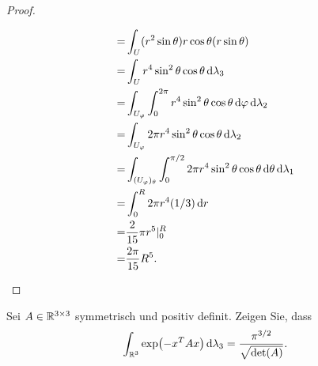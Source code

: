 \begin{proof}
\begin{parts}
\begin{align*}
			 =&\int_U (r^2\sin\theta)r\cos\theta(r\sin\theta)\\
			 =&\int_U r^4\sin^2\theta\cos\theta\dd{\lambda_3}\\
			 =&\int_{U_\varphi}\int_0^{2\pi}r^4\sin^2\theta\cos\theta\dd{\varphi}\dd{\lambda_2}\\
			 =&\int_{U_\varphi}2\pi r^4\sin^2\theta\cos\theta\dd{\lambda_2}\\
			 =&\int_{(U_\varphi)_\theta}\int_0^{\pi / 2}2\pi r^4\sin^2\theta\cos\theta\dd{\theta}\dd{\lambda_1}\\
			 =&\int_0^R 2\pi r^4(1 / 3)\dd{r}\\
			 =&\frac{2}{15}\pi r^5|_0^R\\
			 =&\frac{2\pi}{15}R^5.\qedhere
		\end{align*}
	\end{parts}
\end{proof}
\begin{Problem}
	Sei $A\in \mathbb{R}^{3\times 3}$ symmetrisch und positiv definit. Zeigen Sie, dass
	\[
		\int_{\mathbb{R}^3}\exp(-x^TAx)\dd{\lambda_3}=\frac{\pi^{3 / 2}}{\sqrt{\text{det}(A)} }
	.\] 
\end{Problem}
